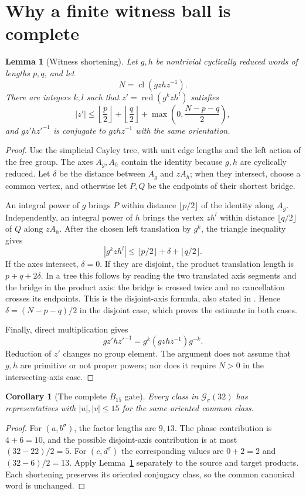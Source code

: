 \documentclass[11pt,a4paper]{article}
\newtheorem{lemma}[theorem]{Lemma}
\newtheorem{corollary}[theorem]{Corollary}
\theoremstyle{definition}\newtheorem{definition}[theorem]{Definition}
\theoremstyle{remark}\newtheorem{remark}[theorem]{Remark}
\newcommand{\cl}{\operatorname{cl}}
\newcommand{\red}{\operatorname{red}}
\begin{document}
\section{Why a finite witness ball is complete}\label{sec:shortening}
\begin{lemma}[Witness shortening]\label{lem:shorten}
Let $g,h$ be nontrivial cyclically reduced words of lengths $p,q$, and let
\[
 N=\cl(gzhz^{-1}).
\]
There are integers $k,l$ such that $z'=\red(g^kzh^l)$ satisfies
\[
 |z'|\le\left\lfloor\frac p2\right\rfloor+
           \left\lfloor\frac q2\right\rfloor+
           \max\left(0,\frac{N-p-q}{2}\right),
\]
and $gz'hz'^{-1}$ is conjugate to $gzhz^{-1}$ with the same orientation.
\end{lemma}
\begin{proof}
Use the simplicial Cayley tree, with unit edge lengths and the left action of the free group. The axes $A_g,A_h$ contain the identity because $g,h$ are cyclically reduced. Let $\delta$ be the distance between $A_g$ and $zA_h$; when they intersect, choose a common vertex, and otherwise let $P,Q$ be the endpoints of their shortest bridge.

An integral power of $g$ brings $P$ within distance $\lfloor p/2\rfloor$ of the identity along $A_g$. Independently, an integral power of $h$ brings the vertex $zh^l$ within distance $\lfloor q/2\rfloor$ of $Q$ along $zA_h$. After the chosen left translation by $g^k$, the triangle inequality gives
\[
 |g^kzh^l|\le\lfloor p/2\rfloor+\delta+\lfloor q/2\rfloor.
\]
If the axes intersect, $\delta=0$. If they are disjoint, the product translation length is $p+q+2\delta$. In a tree this follows by reading the two translated axis segments and the bridge in the product axis: the bridge is crossed twice and no cancellation crosses its endpoints. This is the disjoint-axis formula, also stated in \cite[Section 1.5]{CM}. Hence $\delta=(N-p-q)/2$ in the disjoint case, which proves the estimate in both cases.

Finally, direct multiplication gives
\[
 gz'hz'^{-1}=g^k(gzhz^{-1})g^{-k}.
\]
Reduction of $z'$ changes no group element. The argument does not assume that $g,h$ are primitive or not proper powers; nor does it require $N>0$ in the intersecting-axis case.
\end{proof}

\begin{corollary}[The complete $B_{15}$ gate]\label{cor:b15}
Every class in $\mathcal G_\sigma(32)$ has representatives with $|u|,|v|\le15$ for the same oriented common class.
\end{corollary}
\begin{proof}
For $(a,b^\sigma)$, the factor lengths are $9,13$. The phase contribution is $4+6=10$, and the possible disjoint-axis contribution is at most $(32-22)/2=5$. For $(c,d^\sigma)$ the corresponding values are $0+2=2$ and $(32-6)/2=13$. Apply Lemma~\ref{lem:shorten} separately to the source and target products. Each shortening preserves its oriented conjugacy class, so the common canonical word is unchanged.
\end{proof}
\end{document}
